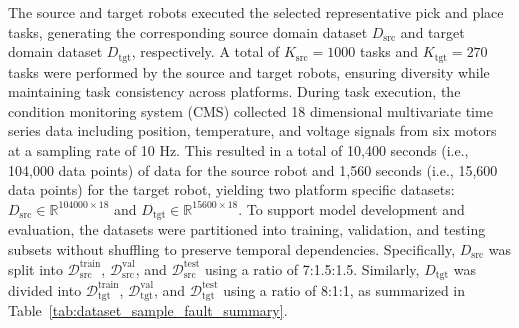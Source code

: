 \documentclass[a4paper,10pt]{cas-sc}%
\newcommand{\roundtworev}[1]{\textcolor{roundtwored}{#1}}
\begin{document}
The source and target robots executed the selected representative pick and place tasks, generating the corresponding source domain dataset \( D_{\text{src}} \) and target domain dataset \( D_{\text{tgt}} \), respectively. A total of $K_{\text{src}}=1000$ tasks and $K_{\text{tgt}}=270$ tasks were performed by the source and target robots, ensuring diversity while maintaining task consistency across platforms. During task execution, the condition monitoring system (CMS) collected 18 dimensional multivariate time series data including position, temperature, and voltage signals from six motors at a sampling rate of 10 Hz. This resulted in a total of 10,400 seconds (i.e., 104,000 data points) of data for the source robot and \roundtworev{1,560 seconds (i.e., 15,600 data points)} for the target robot, yielding two platform specific datasets: $D_{\mathrm{src}}\in\mathbb{R}^{104000\times18}$ and \roundtworev{$D_{\mathrm{tgt}}\in\mathbb{R}^{15600\times18}$}. To support model development and evaluation, the datasets were partitioned into training, validation, and testing subsets without shuffling to preserve temporal dependencies. Specifically, $D_{\mathrm{src}}$ was split into $\mathcal{D}_{\mathrm{src}}^{\mathrm{train}}$, $\mathcal{D}_{\mathrm{src}}^{\mathrm{val}}$, and $\mathcal{D}_{\mathrm{src}}^{\mathrm{test}}$ using a ratio of 7:1.5:1.5. Similarly, \roundtworev{$D_{\mathrm{tgt}}$ was divided into $\mathcal{D}_{\mathrm{tgt}}^{\mathrm{train}}$, $\mathcal{D}_{\mathrm{tgt}}^{\mathrm{val}}$, and $\mathcal{D}_{\mathrm{tgt}}^{\mathrm{test}}$ using a ratio of 8:1:1}, as summarized in Table~\ref{tab:dataset_sample_fault_summary}.
\end{document}
